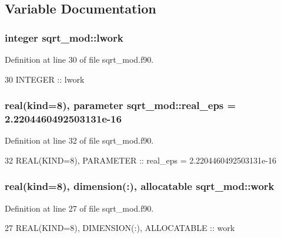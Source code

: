 \subsection{Variable Documentation}
\subsubsection[{\texorpdfstring{lwork}{lwork}}]{\setlength{\rightskip}{0pt plus 5cm}integer sqrt\+\_\+mod\+::lwork\hspace{0.3cm}{\ttfamily [private]}}\hypertarget{namespacesqrt__mod_a1e8a5c8ae6e96f5f02221379e30c0115}{}\label{namespacesqrt__mod_a1e8a5c8ae6e96f5f02221379e30c0115}


Definition at line 30 of file sqrt\+\_\+mod.\+f90.


\begin{DoxyCode}
30   \textcolor{keywordtype}{INTEGER} :: lwork
\end{DoxyCode}
\subsubsection[{\texorpdfstring{real\+\_\+eps}{real_eps}}]{\setlength{\rightskip}{0pt plus 5cm}real(kind=8), parameter sqrt\+\_\+mod\+::real\+\_\+eps = 2.\+2204460492503131e-\/16\hspace{0.3cm}{\ttfamily [private]}}\hypertarget{namespacesqrt__mod_a3e5758c92ccdba50c78201262be093c7}{}\label{namespacesqrt__mod_a3e5758c92ccdba50c78201262be093c7}


Definition at line 32 of file sqrt\+\_\+mod.\+f90.


\begin{DoxyCode}
32   \textcolor{keywordtype}{REAL(KIND=8)}, \textcolor{keywordtype}{PARAMETER} :: real\_eps = 2.2204460492503131e-16
\end{DoxyCode}
\subsubsection[{\texorpdfstring{work}{work}}]{\setlength{\rightskip}{0pt plus 5cm}real(kind=8), dimension(\+:), allocatable sqrt\+\_\+mod\+::work\hspace{0.3cm}{\ttfamily [private]}}\hypertarget{namespacesqrt__mod_aa2d42644fd62e62db048520605cd3de8}{}\label{namespacesqrt__mod_aa2d42644fd62e62db048520605cd3de8}


Definition at line 27 of file sqrt\+\_\+mod.\+f90.


\begin{DoxyCode}
27   \textcolor{keywordtype}{REAL(KIND=8)}, \textcolor{keywordtype}{DIMENSION(:)}, \textcolor{keywordtype}{ALLOCATABLE} :: work
\end{DoxyCode}
